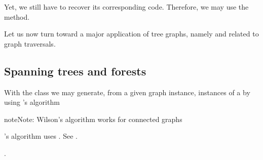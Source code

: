 \documentclass[a4paper,12pt,english]{sphinxhowto}
\begin{document}
Yet, we still have to recover its corresponding  code. Therefore, we may use the  method.

\begin{sphinxVerbatim}[commandchars=\\\{\}]
   
\end{sphinxVerbatim}

Let us now turn toward a major application of tree graphs, namely  and  related to graph traversals.


\subsection{Spanning trees and forests}
\label{\detokenize{tutorial:spanning-trees-and-forests}}
With the  class we may generate, from a given  graph  instance,  instances of a  by using ’s algorithm 

\begin{sphinxadmonition}{note}{Note:}
Wilson’s algorithm  works for connected graphs %
\begin{footnote}[4]\sphinxAtStartFootnote
{}’s algorithm uses . See  .
%
\end{footnote}.
\end{sphinxadmonition}
\end{document}
